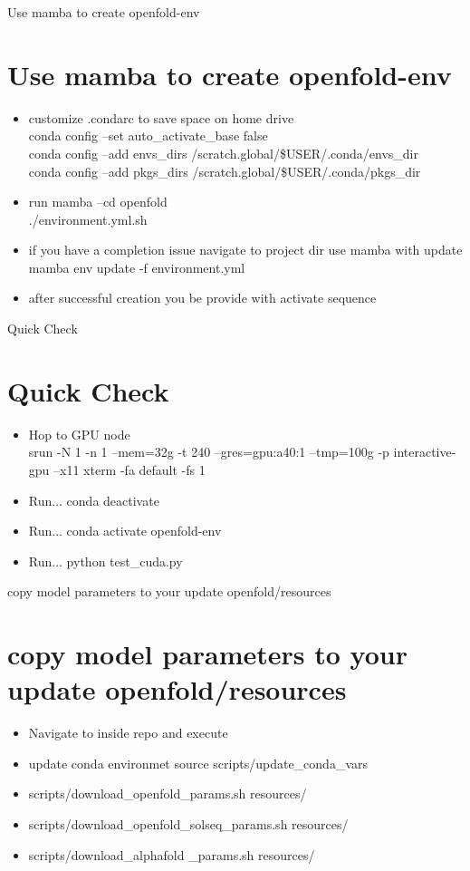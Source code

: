\documentclass[xcolor = svgnames,hyperref = {colorlinks = true},]{beamer}
\newcommand{\sectframe}[1]{\begin{frame}{#1}
		\section{#1}
}
\begin{document}
\sectframe{Use mamba to create openfold-env}
\begin{tcolorbox}[colback=blue!5!white,colframe=blue!75!black]
	\begin{itemize}{}
		\item{customize .condarc to save space on home drive}\\
		conda config --set auto\_activate\_base false\\
		conda config --add envs\_dirs /scratch.global/\$USER/.conda/envs\_dir\\
		conda config --add pkgs\_dirs /scratch.global/\$USER/.conda/pkgs\_dir	
		\item{run mamba --cd openfold}\\
		./environment.yml.sh
		\item{if you have a completion issue navigate to project dir use mamba with update}\\
		mamba env update -f environment.yml
		\item{after successful creation you be provide with activate sequence}\\	
	\end{itemize}
\end{tcolorbox}
\end{frame}

\sectframe{Quick Check}
\begin{tcolorbox}[colback=blue!5!white,colframe=blue!75!black]
	\begin{itemize}{}
		\item{Hop to GPU node}\\
		srun -N 1 -n 1 --mem=32g -t 240 --gres=gpu:a40:1 --tmp=100g -p interactive-gpu --x11 xterm  -fa default -fs 1
		\item{Run... conda deactivate}
		\item{Run... conda activate openfold-env}
		\item{Run... python test\_cuda.py}
	\end{itemize}
\end{tcolorbox}
\end{frame}



\sectframe{copy model parameters to your update openfold/resources}
\begin{tcolorbox}[colback=blue!5!white,colframe=blue!75!black]
	\begin{itemize}{}
		\item{Navigate to inside repo and execute}
		\item{update conda environmet}
		source scripts/update\_conda\_vars
		\item{scripts/download\_openfold\_params.sh resources/}	
		\item{scripts/download\_openfold\_solseq\_params.sh resources/}
		\item{scripts/download\_alphafold \_params.sh resources/}
	\end{itemize}
\end{tcolorbox}
\end{frame}
\end{document}
